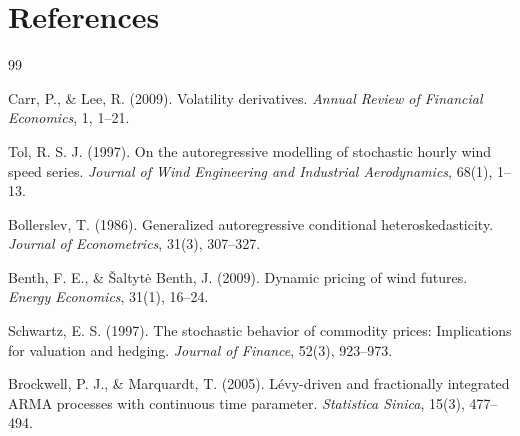 \documentclass[11pt, a4paper, twoside]{article}
\begin{document}
\section*{References}

\begin{thebibliography}{99}

Carr, P., \& Lee, R. (2009). Volatility derivatives. \textit{Annual Review of Financial Economics}, 1, 1--21.

Tol, R. S. J. (1997). On the autoregressive modelling of stochastic hourly wind speed series. \textit{Journal of Wind Engineering and Industrial Aerodynamics}, 68(1), 1--13.

Bollerslev, T. (1986). Generalized autoregressive conditional heteroskedasticity. \textit{Journal of Econometrics}, 31(3), 307--327.

Benth, F. E., \& Šaltytė Benth, J. (2009). Dynamic pricing of wind futures. \textit{Energy Economics}, 31(1), 16--24.

Schwartz, E. S. (1997). The stochastic behavior of commodity prices: Implications for valuation and hedging. \textit{Journal of Finance}, 52(3), 923--973.

Brockwell, P. J., \& Marquardt, T. (2005). Lévy-driven and fractionally integrated ARMA processes with continuous time parameter. \textit{Statistica Sinica}, 15(3), 477--494.

\end{thebibliography}
\end{document}
